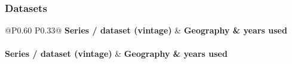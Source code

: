 \subsubsection*{Datasets}
{\scriptsize\raggedright
\begin{longtable}{@{}P{0.60\textwidth} P{0.33\textwidth}@{}}
\toprule
\textbf{Series / dataset (vintage)} & \textbf{Geography \& years used} \\
\midrule
\endfirsthead
{}\\
\toprule
\textbf{Series / dataset (vintage)} & \textbf{Geography \& years used} \\
\midrule
\endhead
\bottomrule
\endfoot


\end{longtable}}
